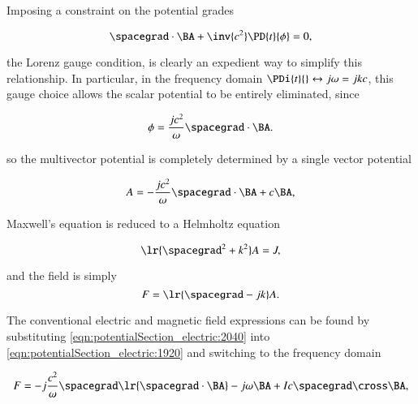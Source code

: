 Imposing a constraint on the potential grades

\begin{dmath}\label{eqn:potentialSection_electric:2020}
\spacegrad \cdot \BA + \inv{c^2} \PD{t}{\phi} = 0,
\end{dmath}

the Lorenz gauge condition, is clearly an expedient way to simplify this relationship.
In particular,
in the frequency domain \( \PDi{t}{} \leftrightarrow j \omega = j k c \), this gauge choice allows the scalar potential to be entirely eliminated, since

\begin{dmath}\label{eqn:potentialSection_electric:2040}
\phi = \frac{j c^2}{\omega} \spacegrad \cdot \BA.
\end{dmath}

so the multivector potential is completely determined by a single vector potential

\begin{dmath}\label{eqn:potentialSection_electric:2060}
A =
-\frac{j c^2}{\omega} \spacegrad \cdot \BA + c \BA,
\end{dmath}

Maxwell's equation is reduced to a Helmholtz equation

\begin{dmath}\label{eqn:potentialSection_electric:2080}
\lr{ \spacegrad^2 + k^2} A = J,
\end{dmath}

and the field is simply
\begin{dmath}\label{eqn:potentialSection_electric:2100}
F = \lr{ \spacegrad - j k } A.
\end{dmath}

The conventional electric and magnetic field expressions can be found by substituting \cref{eqn:potentialSection_electric:2040} into
\cref{eqn:potentialSection_electric:1920} and switching to the frequency domain

\begin{dmath}\label{eqn:potentialSection_electric:2380}
F
=
-j \frac{c^2}{\omega} \spacegrad \lr{ \spacegrad \cdot \BA }
-j \omega \BA
+ I c \spacegrad \cross \BA,
\end{dmath}

%
%

